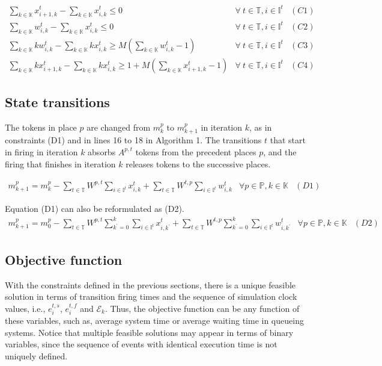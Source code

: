 \documentclass[suppldata]{interact}
\theoremstyle{plain}
\theoremstyle{definition}
\theoremstyle{remark}
\begin{document}
\begin{eqnarray}
	\sum_{k\in \mathbb{K}} x^{t}_{i+1,k} - \sum_{k\in \mathbb{K}} x^{t}_{i,k} \le 0&  \forall\ t\in \mathbb{T},i\in \mathbb{I}^{t}&(C1)\nonumber\\
	\sum_{k\in \mathbb{K}} w^{t}_{i,k}-\sum_{k\in \mathbb{K}} x^{t}_{i,k} \le 0&  \forall\ t\in \mathbb{T},i\in \mathbb{I}^{t}&(C2)\nonumber\\
	\sum_{k\in \mathbb{K}} kw^{t}_{i,k} - \sum_{k\in \mathbb{K}} kx^{t}_{i,k} \ge M(\sum_{k\in \mathbb{K}} w^{t}_{i,k}-1) &\forall\ t\in \mathbb{T}, i\in \mathbb{I}^{t}&(C3) \nonumber\\
	\sum_{k\in \mathbb{K}} kx^{t}_{i+1,k} - \sum_{k\in \mathbb{K}} kx^{t}_{i,k} \ge 1+M(\sum_{k\in \mathbb{K}} x^{t}_{i+1,k}-1)&  \forall\ t\in \mathbb{T},i\in \mathbb{I}^{t}&(C4)\nonumber
\end{eqnarray}

\subsection{State transitions}

The tokens in place $p$ are changed from $m^{p}_{k}$ to $m^{p}_{k+1}$ in iteration $k$, as in constraints (D1) and in lines 16 to 18 in Algorithm 1. The transitions $t$ that start in %
firing in iteration $k$ absorbs $A^{p,t}$ tokens from the precedent places $p$, and the firing that finishes in iteration $k$ releases tokens to the successive places. 

\begin{eqnarray}
	m^p_{k+1} = m^p_k - \sum_{t\in \mathbb{T}} W^{p,t} \sum_{i\in \mathbb{I}^{t}} x^t_{i,k} +  \sum_{t\in \mathbb{T}} W^{t,p} \sum_{i\in \mathbb{I}^{t}} w^t_{i,k} &\forall p\in \mathbb{P}, k\in \mathbb{K}& (D1) \nonumber
\end{eqnarray}

Equation (D1) can also be reformulated as (D2).
\begin{eqnarray}
	m^p_{k+1} = m^p_0 - \sum_{t\in \mathbb{T}} W^{p,t} \sum_{k^{'}=0}^k \sum_{i\in \mathbb{I}^{t}} x^t_{i,k^{'}} +  \sum_{t\in \mathbb{T}} W^{t,p} \sum_{k^{'}=0}^k \sum_{i\in \mathbb{I}^{t}} w^t_{i,k^{'}} &\forall p\in \mathbb{P}, k\in \mathbb{K}& (D2) \nonumber
\end{eqnarray}

\subsection{Objective function}\label{sec:TPN_obj}
With the constraints defined in the previous sections, there is a unique feasible solution in terms of transition firing times and the %
sequence of simulation clock values, i.e., $e^{t,s}_i$, $e^{t,f}_{i}$ and $\mathcal{E}_k$. Thus, the objective function can be any function of %
these variables, such as, average system time or average waiting time in queueing systems. Notice that multiple feasible solutions may appear in terms of binary variables, since the sequence of events with identical execution time is not uniquely defined.
\end{document}
